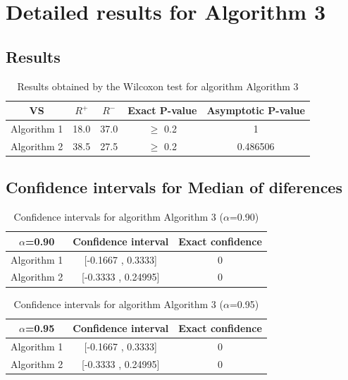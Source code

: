 \documentclass[a4paper,10pt]{article}
\begin{document}
 \clearpage 


\section{Detailed results for Algorithm 3}


\subsection{Results}

\begin{table}[!htp]
\centering\small
\begin{tabular}{
|c|c|c|c|c|}
\hline
 VS & $R^{+}$ & $R^{-}$ & Exact P-value & Asymptotic P-value \\ \hline 
Algorithm 1 & 18.0 & 37.0 & $\geq$ 0.2 & 1\\ \hline 
Algorithm 2 & 38.5 & 27.5 & $\geq$ 0.2 & 0.486506\\ \hline 

\end{tabular}
\caption{Results obtained by the Wilcoxon test for algorithm Algorithm 3}
\end{table}

\subsection{Confidence intervals for Median of diferences}

\begin{table}[!htp]
\centering\small
\begin{tabular}{
|c|c|c|}
\hline
 $\alpha$=0.90 & Confidence interval & Exact confidence \\ \hline 
Algorithm 1 & [-0.1667 , 0.3333] & 0\\ \hline 
Algorithm 2 & [-0.3333 , 0.24995] & 0\\ \hline 

\end{tabular}
\caption{Confidence intervals for algorithm Algorithm 3 ($\alpha$=0.90)}
\end{table}
\begin{table}[!htp]
\centering\small
\begin{tabular}{
|c|c|c|}
\hline
 $\alpha$=0.95 & Confidence interval & Exact confidence \\ \hline 
Algorithm 1 & [-0.1667 , 0.3333] & 0\\ \hline 
Algorithm 2 & [-0.3333 , 0.24995] & 0\\ \hline 

\end{tabular}
\caption{Confidence intervals for algorithm Algorithm 3 ($\alpha$=0.95)}
\end{table}

 \clearpage 
\end{document}
